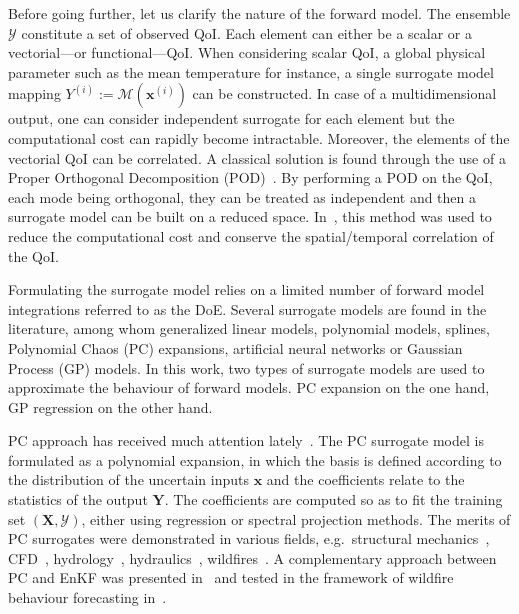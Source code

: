 Before going further, let us clarify the nature of the forward model. The ensemble $\mathcal{Y}$ constitute a set of observed QoI. Each element can either be a scalar or a vectorial---or functional---QoI. When considering scalar QoI, a global physical parameter such as the mean temperature for instance, a single surrogate model mapping $Y^{(i)} := \mathcal{M}(\mathbf{x}^{(i)})$ can be constructed. In case of a multidimensional output, one can consider independent surrogate for each element but the computational cost can rapidly become intractable. Moreover, the elements of the vectorial QoI can be correlated. A classical solution is found through the use of a Proper Orthogonal Decomposition (POD)~\cite{AnindyaChatterjee2000}. By performing a POD on the QoI, each mode being orthogonal, they can be treated as independent and then a surrogate model can be built on a reduced space. In~\cite{braconnier2011,margheri2016}, this method was used to reduce the computational cost and conserve the spatial/temporal correlation of the QoI.

Formulating the surrogate model relies on a limited number of forward model integrations referred to as the DoE. Several surrogate models are found in the literature, among whom generalized linear models, polynomial models, splines, Polynomial Chaos (PC) expansions, artificial neural networks or Gaussian Process (GP) models. In this work, two types of surrogate models are used to approximate the behaviour of forward models. PC expansion on the one hand, GP regression on the other hand. 

PC approach has received much attention lately~\citep{dubreuil2014,sudret2008,xiu2010,xiu2002,Ciriello2013}. The PC surrogate model is formulated as a polynomial expansion, in which the basis is defined according to the distribution of the uncertain inputs $\mathbf{x}$ and the coefficients relate to the statistics of the output $\mathbf{Y}$. The coefficients are computed so as to fit the training set $(\mathbf{X}, \mathcal{Y})$, either using regression or spectral projection methods. The merits of PC surrogates were demonstrated in various fields, e.g.~structural mechanics~\citep{dubreuil2014,berveiller2005}, CFD~\citep{hosder2006,lucor2007,saad2007phd}, hydrology~\citep{deman2015}, hydraulics~\citep{ge2008,elmocaydphd}, wildfires~\citep{rochoux2014}. A complementary approach between PC and EnKF was presented in~\citet{lixiu2009} and tested in the framework of wildfire behaviour forecasting in~\citet{rochoux2014}. 

